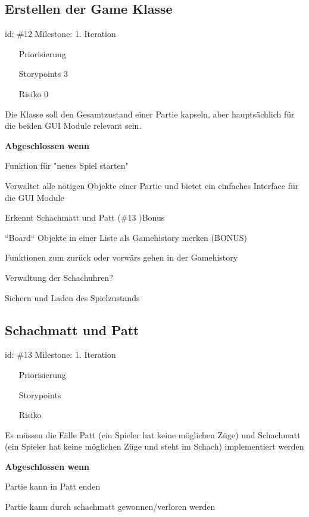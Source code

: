 \subsection*{Erstellen der Game Klasse}
id: \#12 Milestone: 1. Iteration\\

\begin{itemize}
\item[Priorisierung] 
\item[Storypoints] 3
\item[Risiko] 0
\end{itemize}

Die  Klasse soll den Gesamtzustand einer Partie kapseln, aber hauptsächlich für die beiden GUI Module relevant sein.

\textbf{Abgeschlossen wenn}
\begin{todolist}
    \item[\done]  Funktion für "neues Spiel starten"
  \item  Verwaltet alle nötigen Objekte einer Partie und bietet ein einfaches Interface für die GUI Module
  \item  Erkennt Schachmatt und Patt (\#13 )Bonus
  \item[\done]  ``Board`` Objekte in einer Liste als Gamehistory merken (BONUS)
  \item  Funktionen zum zurück oder vorwärs gehen in der Gamehistory
  \item  Verwaltung der Schachuhren?
  \item  Sichern und Laden des Spielzustands

\end{todolist}

\subsection*{Schachmatt und Patt}
id: \#13 Milestone: 1. Iteration\\

\begin{itemize}
\item[Priorisierung] 
\item[Storypoints] 
\item[Risiko] 
\end{itemize}

Es müssen die Fälle Patt (ein Spieler hat keine möglichen Züge) und Schachmatt (ein Spieler hat keine möglichen Züge und steht im Schach) implementiert werden

\textbf{Abgeschlossen wenn}
\begin{todolist}
    \item  Partie kann in Patt enden
  \item  Partie kann durch schachmatt gewonnen/verloren werden

\end{todolist}
